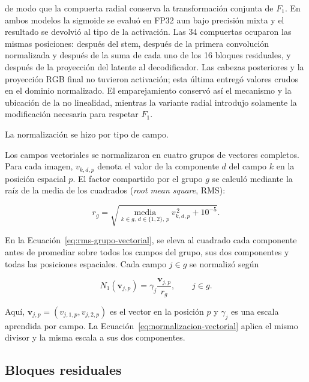 de modo que la compuerta radial conserva la transformación conjunta de
\(F_1\). En ambos modelos la sigmoide se evaluó en FP32 aun bajo
precisión mixta y el resultado se devolvió al tipo de la activación. Las 34
compuertas ocuparon las mismas posiciones: después del stem, después de la
primera convolución normalizada y después de la suma de cada uno de los 16
bloques residuales, y después de la proyección del latente al decodificador.
Las cabezas posteriores y la proyección RGB final no tuvieron activación; esta
última entregó valores crudos en el dominio normalizado. El emparejamiento
conservó así el mecanismo y la ubicación de la no linealidad, mientras la
variante radial introdujo solamente la modificación necesaria para respetar
\(F_1\).

La normalización se hizo por tipo de campo.

Los campos vectoriales se normalizaron en cuatro grupos de vectores completos.
Para cada imagen, \(v_{k,d,p}\) denota el valor de la componente \(d\) del
campo \(k\) en la posición espacial \(p\). El factor compartido por el grupo
\(g\) se calculó mediante la raíz de la media de los cuadrados
(\emph{root mean square}, RMS):

\begin{equation}
    r_g=\sqrt{
        \underset{k\in g,\,d\in\{1,2\},\,p}{\operatorname{media}}
        v_{k,d,p}^{\,2}+10^{-5}}.
    \label{eq:rms-grupo-vectorial}
\end{equation}

En la Ecuación~\ref{eq:rms-grupo-vectorial}, se eleva al cuadrado cada
componente antes de promediar sobre todos los campos del grupo, sus dos
componentes y todas las posiciones espaciales. Cada campo \(j\in g\) se
normalizó según

\begin{equation}
    N_1(\mathbf v_{j,p})=\gamma_j\frac{\mathbf v_{j,p}}{r_g},
    \qquad j\in g.
    \label{eq:normalizacion-vectorial}
\end{equation}

Aquí, \(\mathbf v_{j,p}=(v_{j,1,p},v_{j,2,p})\) es el vector en la posición
\(p\) y \(\gamma_j\) es una escala aprendida por campo. La
Ecuación~\ref{eq:normalizacion-vectorial} aplica el mismo divisor y la misma
escala a sus dos componentes.

\subsection{Bloques residuales}

